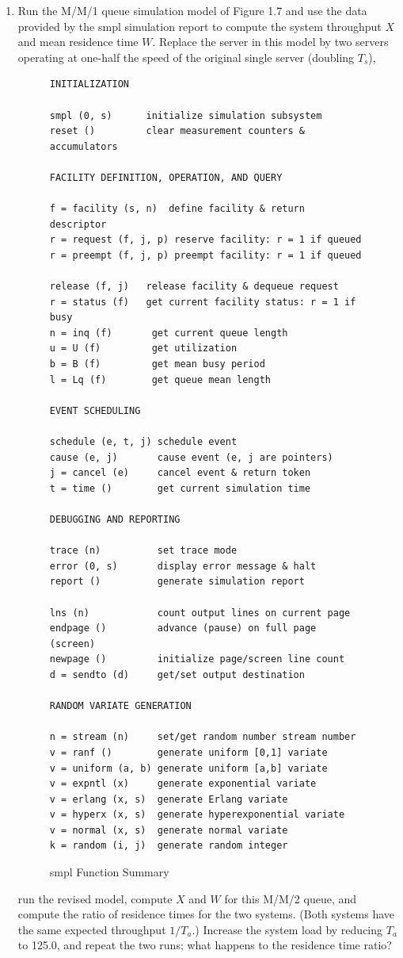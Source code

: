\begin{enumerate}
\item Run the M/M/1 queue simulation model of Figure 1.7 and use the data
provided by the smpl simulation report to compute the system throughput $X$
and mean residence time $W$. Replace the server in this model by two servers
operating at one-half the speed of the original single server (doubling $T_s$),
\begin{figure}[H]
\centering
\begingroup\fontsize{8}{9.4}\selectfont
\begin{verbatim}
INITIALIZATION

smpl (0, s)      initialize simulation subsystem
reset ()         clear measurement counters & accumulators

FACILITY DEFINITION, OPERATION, AND QUERY

f = facility (s, n)  define facility & return descriptor
r = request (f, j, p) reserve facility: r = 1 if queued
r = preempt (f, j, p) preempt facility: r = 1 if queued

release (f, j)   release facility & dequeue request
r = status (f)   get current facility status: r = 1 if busy
n = inq (f)       get current queue length
u = U (f)         get utilization
b = B (f)         get mean busy period
l = Lq (f)        get queue mean length

EVENT SCHEDULING

schedule (e, t, j) schedule event
cause (e, j)       cause event (e, j are pointers)
j = cancel (e)     cancel event & return token
t = time ()        get current simulation time

DEBUGGING AND REPORTING

trace (n)          set trace mode
error (0, s)       display error message & halt
report ()          generate simulation report

lns (n)            count output lines on current page
endpage ()         advance (pause) on full page (screen)
newpage ()         initialize page/screen line count
d = sendto (d)     get/set output destination

RANDOM VARIATE GENERATION

n = stream (n)     set/get random number stream number
v = ranf ()        generate uniform [0,1] variate
v = uniform (a, b) generate uniform [a,b] variate
v = expntl (x)     generate exponential variate
v = erlang (x, s)  generate Erlang variate
v = hyperx (x, s)  generate hyperexponential variate
v = normal (x, s)  generate normal variate
k = random (i, j)  generate random integer
\end{verbatim}
\endgroup
\caption{smpl Function Summary}
\end{figure}
\noindent run the revised model, compute $X$ and $W$ for this M/M/2 queue, and compute
the ratio of residence times for the two systems. (Both systems have the same
expected throughput $1/T_a$.) Increase the system load by reducing $T_a$ to
125.0, and repeat the two runs; what happens to the residence time ratio?


\end{enumerate}
